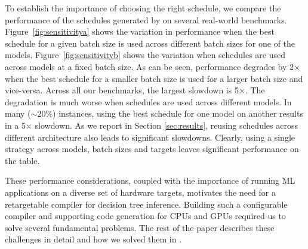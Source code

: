 To establish the importance of choosing the right schedule, we
compare the performance of the schedules generated by \Treebeard{}
on several real-world benchmarks. 
Figure~\ref{fig:sensitivitya} shows the
variation in performance when the best schedule for a given batch 
size is used across different batch sizes for one of the models. 
Figure~\ref{fig:sensitivityb} shows the variation when schedules 
are used across models at a fixed batch size.
As can be seen, performance degrades by 2$\times$ when the best schedule for a
smaller batch size is used for a larger batch size and vice-versa.
Across all our benchmarks, the largest slowdown is 5$\times$.  %
The degradation is much worse when schedules are used across different models.
In many ($\sim20$\%) instances, using the best schedule for one model 
on another results in a 5$\times$ slowdown.
As we report in Section \ref{sec:results}, reusing schedules across
different architecture also leads to significant slowdowns.
Clearly, using a single strategy across models, batch sizes and targets
leaves significant performance on the table. 

These performance considerations, coupled with 
the importance of running ML applications on a diverse set of hardware targets,
motivates the need for a retargetable compiler for decision tree inference.
Building such a configurable compiler and supporting code generation for CPUs and GPUs 
required us to solve several fundamental problems. 
The rest of the paper describes these challenges in detail and how we
solved them in \Treebeard{}.

